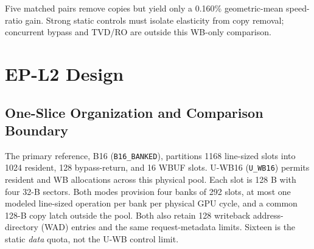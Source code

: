 \documentclass[conference,letterpaper]{IEEEtran}
\newcommand{\base}{B16}
\newcommand{\unif}{U-WB16}
\begin{document}
Five matched pairs remove copies but yield only a 0.160\% geometric-mean speed-ratio gain. Strong static controls must isolate elasticity from copy removal; concurrent bypass and TVD/RO are outside this WB-only comparison.

\section{EP-L2 Design}
\subsection{One-Slice Organization and Comparison Boundary}
The primary reference, \base{} (\texttt{B16\_BANKED}), partitions 1168 line-sized slots into 1024 resident, 128 bypass-return, and 16 WBUF slots. \unif{} (\texttt{U\_WB16}) permits resident and WB allocations across this physical pool. Each slot is 128 B with four 32-B sectors. Both modes provision four banks of 292 slots, at most one modeled line-sized operation per bank per physical GPU cycle, and a common 128-B copy latch outside the pool. Both also retain 128 writeback address-directory (WAD) entries and the same request-metadata limits. Sixteen is the static \emph{data} quota, not the U-WB control limit.
\end{document}
